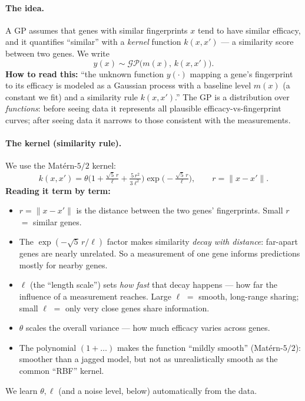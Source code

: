 \documentclass[11pt]{article}
\begin{document}
\paragraph{The idea.} A GP assumes that genes with similar fingerprints $x$ tend to have
similar efficacy, and it quantifies ``similar'' with a \emph{kernel} function $k(x,x')$ ---
a similarity score between two genes. We write
\begin{equation}
y(x)\sim\mathcal{GP}\big(m(x),\,k(x,x')\big).
\end{equation}
\textbf{How to read this:} ``the unknown function $y(\cdot)$ mapping a gene's fingerprint
to its efficacy is modeled as a Gaussian process with a baseline level $m(x)$ (a constant
we fit) and a similarity rule $k(x,x')$.'' The GP is a distribution over \emph{functions}:
before seeing data it represents all plausible efficacy-vs-fingerprint curves; after seeing
data it narrows to those consistent with the measurements.

\paragraph{The kernel (similarity rule).} We use the Mat\'ern-$5/2$ kernel:
\begin{equation}
k(x,x') = \theta\Big(1+\tfrac{\sqrt{5}\,r}{\ell}+\tfrac{5\,r^2}{3\ell^2}\Big)\exp\!\Big(-\tfrac{\sqrt5\, r}{\ell}\Big),\qquad r=\lVert x-x'\rVert .
\end{equation}
\textbf{Reading it term by term:}
\begin{itemize}[leftmargin=2em,itemsep=1pt]
\item $r=\lVert x-x'\rVert$ is the distance between the two genes' fingerprints. Small $r$
$=$ similar genes.
\item The $\exp(-\sqrt5\,r/\ell)$ factor makes similarity \emph{decay with distance}: far-apart
genes are nearly unrelated. So a measurement of one gene informs predictions mostly for
nearby genes.
\item $\ell$ (the ``length scale'') sets \emph{how fast} that decay happens --- how far the
influence of a measurement reaches. Large $\ell$ $=$ smooth, long-range sharing; small
$\ell$ $=$ only very close genes share information.
\item $\theta$ scales the overall variance --- how much efficacy varies across genes.
\item The polynomial $(1+\dots)$ makes the function ``mildly smooth'' (Mat\'ern-$5/2$): smoother
than a jagged model, but not as unrealistically smooth as the common ``RBF'' kernel.
\end{itemize}
We learn $\theta,\ell$ (and a noise level, below) automatically from the data.
\end{document}
